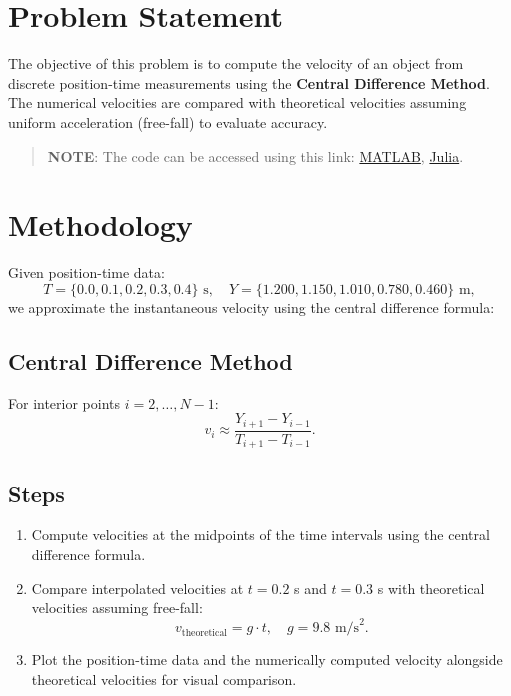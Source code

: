 \section*{Problem Statement}
The objective of this problem is to compute the velocity of an object from discrete position-time measurements using the \textbf{Central Difference Method}. The numerical velocities are compared with theoretical velocities assuming uniform acceleration (free-fall) to evaluate accuracy.

\begin{quote}
  \textbf{NOTE}: The code can be accessed using this link: \href{https://raw.githubusercontent.com/HavokSahil/computational-techniques-assignments/refs/heads/main/assignment5/a4.m}{MATLAB}, \href{https://raw.githubusercontent.com/HavokSahil/computational-techniques-assignments/refs/heads/main/assignment5/a4.jl}{Julia}.
\end{quote}

\section*{Methodology}
Given position-time data:
\[
T = \{0.0, 0.1, 0.2, 0.3, 0.4\} \text{ s}, \quad
Y = \{1.200, 1.150, 1.010, 0.780, 0.460\} \text{ m},
\]
we approximate the instantaneous velocity using the central difference formula:

\subsection*{Central Difference Method}
For interior points \(i = 2, \dots, N-1\):
\[
v_i \approx \frac{Y_{i+1} - Y_{i-1}}{T_{i+1} - T_{i-1}}.
\]

\subsection*{Steps}
\begin{enumerate}
    \item Compute velocities at the midpoints of the time intervals using the central difference formula.
    \item Compare interpolated velocities at \(t = 0.2\) s and \(t = 0.3\) s with theoretical velocities assuming free-fall:
    \[
    v_\text{theoretical} = g \cdot t, \quad g = 9.8 \text{ m/s}^2.
    \]
    \item Plot the position-time data and the numerically computed velocity alongside theoretical velocities for visual comparison.
\end{enumerate}


